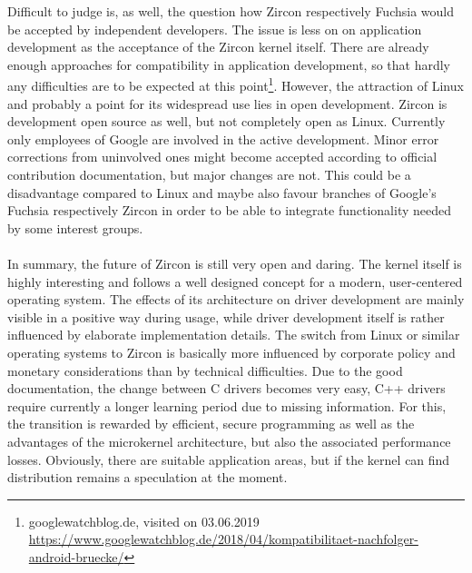 Difficult to judge is, as well, the question how Zircon respectively Fuchsia would be accepted by independent developers.
The issue is less on on application development as the acceptance of the Zircon kernel itself.
There are already enough approaches for compatibility in application development, so that hardly any difficulties are to be expected at this point\footnote{googlewatchblog.de, visited on 03.06.2019 \url{https://www.googlewatchblog.de/2018/04/kompatibilitaet-nachfolger-android-bruecke/}}.
However, the attraction of Linux and probably a point for its widespread use lies in open development.
Zircon is development open source as well, but not completely open as Linux.
Currently only employees of Google are involved in the active development.
Minor error corrections from uninvolved ones might become accepted according to official contribution documentation, but major changes are not.
This could be a disadvantage compared to Linux and maybe also favour branches of Google's Fuchsia respectively Zircon in order to be able to integrate functionality needed by some interest groups.
\\
\\
In summary, the future of Zircon is still very open and daring.
The kernel itself is highly interesting and follows a well designed concept for a modern, user-centered operating system.
The effects of its architecture on driver development are mainly visible in a positive way during usage, while driver development itself is rather influenced by  elaborate implementation details.
The switch from Linux or similar operating systems to Zircon is basically more influenced by corporate policy and monetary considerations than by technical difficulties.
Due to the good documentation, the change between C drivers becomes very easy, C++ drivers require currently a longer learning period due to missing information.
For this, the transition is rewarded by efficient, secure programming as well as the advantages of the microkernel architecture, but also the associated performance losses.
Obviously, there are suitable application areas, but if the kernel can find distribution remains a speculation at the moment.
